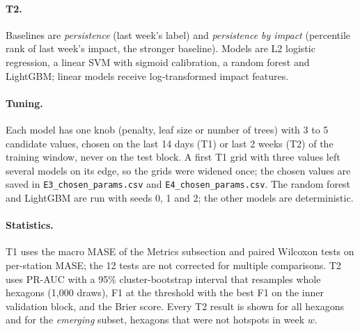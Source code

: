 \paragraph{T2.} Baselines are \emph{persistence} (last week's label) and \emph{persistence by impact} (percentile rank of last week's impact, the stronger baseline). Models are L2 logistic regression, a linear SVM with sigmoid calibration, a random forest and LightGBM; linear models receive log-transformed impact features.

\paragraph{Tuning.} Each model has one knob (penalty, leaf size or number of trees) with 3 to 5 candidate values, chosen on the last 14 days (T1) or last 2 weeks (T2) of the training window, never on the test block. A first T1 grid with three values left several models on its edge, so the grids were widened once; the chosen values are saved in \texttt{E3\_chosen\_params.csv} and \texttt{E4\_chosen\_params.csv}. The random forest and LightGBM are run with seeds 0, 1 and 2; the other models are deterministic.

\paragraph{Statistics.} T1 uses the macro MASE of the Metrics subsection and paired Wilcoxon tests on per-station MASE; the 12 tests are not corrected for multiple comparisons. T2 uses PR-AUC with a 95\% cluster-bootstrap interval that resamples whole hexagons (1{,}000 draws), F1 at the threshold with the best F1 on the inner validation block, and the Brier score. Every T2 result is shown for all hexagons and for the \emph{emerging} subset, hexagons that were not hotspots in week $w$.
